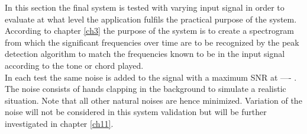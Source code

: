 In this section the final system is tested with varying input signal in order to evaluate at what level the application fulfils the practical purpose of the system. According to chapter \ref{ch3} the purpose of the system is to create a spectrogram from which the significant frequencies over time are to be recognized by the peak detection algorithm to match the frequencies known to be in the input signal according to the tone or chord played. \\
In each test the same noise is added to the signal with a maximum SNR at ---- . The noise consists of hands clapping in the background to simulate a realistic situation. Note that all other natural noises are hence minimized. Variation of the noise will not be considered in this system validation but will be further investigated in chapter \ref{ch11}.


